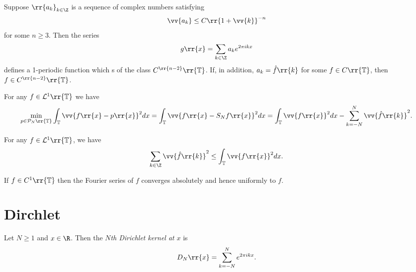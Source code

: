 \documentclass{article}
\begin{document}
\begin{proposition}
  Suppose $\rr{a_k}_{k\in\Z}$ is a sequence of complex numbers satisfying
  \begin{align*}
    \vv{a_k}\leq C\rr{1+\vv{k}}^{-n}
  \end{align*}
  for some $n\geq 3$. Then the series
  \begin{align*}
    g\rr{x}=\sum_{k\in\Z} a_k e^{2\pi ikx}
  \end{align*}
  defines a 1-periodic function which s of the class $C^{\rr{n-2}}\rr{\mathbb T}$. If,
  in addition, $a_k=\hat f\rr{k}$ for some $f\in C\rr{\mathbb T}$, then
  $f\in C^{\rr{n-2}}\rr{\mathbb T}$.
\end{proposition}

\begin{proposition}
  For any $f\in\mathcal L^1\rr{\mathbb T}$ we have
  \begin{align*}
    \min_{p\in\mathcal P_N\rr{\mathbb T}} \int_{\mathbb T}\vv{f\rr{x}-p\rr{x}}^2 dx
    = \int_{\mathbb T}\vv{f\rr{x}-S_Nf\rr{x}}^2dx
    = \int_{\mathbb T}\vv{f\rr{x}}^2dx - \sum_{k=-N}^{ N } \vv{\hat f\rr{k}}^2.
  \end{align*}
\end{proposition}

\begin{corollary}[Bessel]
  For any $f\in\mathcal L^1\rr{\mathbb T}$, we have
  \begin{align*}
    \sum_{k\in\Z}\vv{\hat f\rr{k}}^2 \leq \int_{\mathbb T}\vv{f\rr{x}}^2dx.
  \end{align*}
\end{corollary}

\begin{proposition}
  If $f\in C^1\rr{\mathbb T}$ then the Fourier series of $f$ converges absolutely and hence
  uniformly to $f$.
\end{proposition}

\section{Dirchlet}\label{sec:pointwise_convergence}

\begin{definition}
  Let $N\geq 1$ and $x\in\R$. Then the \emph{$N$th Dirichlet kernel at $x$} is
  \begin{align*}
    D_N\rr{x}=\sum_{k=-N}^N e^{2\pi ikx}.
  \end{align*}
\end{definition}
\end{document}
